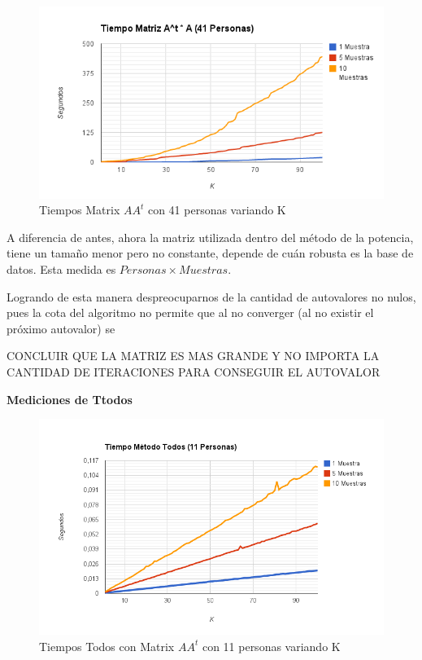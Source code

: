 \begin{figure}[H]
\includegraphics[width=1\textwidth]{img/imagec.png}
     \caption{Tiempos Matrix $AA^t$ con 41 personas variando K}
\end{figure}

A diferencia de antes, ahora la matriz utilizada dentro del m\'etodo de la potencia, tiene un tama\~no menor pero no constante, depende de cu\'an robusta es la base de datos. Esta medida es $Personas \times Muestras$.

Logrando de esta manera despreocuparnos de la cantidad de autovalores no nulos, pues la cota del algoritmo no permite que al no converger (al no existir el pr\'oximo autovalor) se 

CONCLUIR QUE LA MATRIZ ES MAS GRANDE Y NO IMPORTA LA CANTIDAD DE ITERACIONES PARA CONSEGUIR EL AUTOVALOR

\textbf{Mediciones de Ttodos }

\begin{figure}[H]
\includegraphics[width=1\textwidth]{img/imaged.png}
     \caption{Tiempos Todos con Matrix $AA^t$ con 11 personas variando K}
\end{figure}

